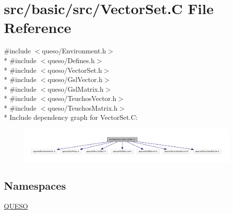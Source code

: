 \hypertarget{_vector_set_8_c}{\section{src/basic/src/\-Vector\-Set.C File Reference}
\label{_vector_set_8_c}
}
{\ttfamily \#include $<$queso/\-Environment.\-h$>$}\\*
{\ttfamily \#include $<$queso/\-Defines.\-h$>$}\\*
{\ttfamily \#include $<$queso/\-Vector\-Set.\-h$>$}\\*
{\ttfamily \#include $<$queso/\-Gsl\-Vector.\-h$>$}\\*
{\ttfamily \#include $<$queso/\-Gsl\-Matrix.\-h$>$}\\*
{\ttfamily \#include $<$queso/\-Teuchos\-Vector.\-h$>$}\\*
{\ttfamily \#include $<$queso/\-Teuchos\-Matrix.\-h$>$}\\*
Include dependency graph for Vector\-Set.\-C\-:
\nopagebreak
\begin{figure}[H]
\begin{center}
\leavevmode
\includegraphics[width=350pt]{_vector_set_8_c__incl}
\end{center}
\end{figure}
\subsection*{Namespaces}
\begin{DoxyCompactItemize}
\item 
\hyperlink{namespace_q_u_e_s_o}{Q\-U\-E\-S\-O}
\end{DoxyCompactItemize}
